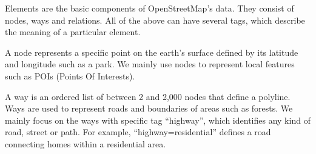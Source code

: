 Elements are the basic components of OpenStreetMap's data. They consist of nodes, ways and relations. All of the above can have several tags, which describe the meaning of a particular element.

A node represents a specific point on the earth's surface defined by 
its latitude and longitude such as a park.
We mainly use nodes to represent local features such as POIs (Points Of Interests). 

A way is an ordered list of between 2 and 2,000 nodes that define 
a polyline. Ways are used to represent roads and boundaries 
of areas such as forests. 
We mainly focus on the ways 
with specific tag ``highway'', 
which identifies any kind of road, street or path.
For example, ``highway=residential'' defines a road connecting 
homes within a residential area. 

